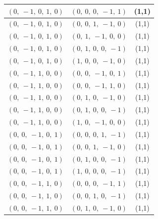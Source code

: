 \documentclass[11pt]{article}
\theoremstyle{definition}
\begin{document}
\begin{longtable}{|l|l|c|}
    \hline
    $\left( 0, \  -1, \  0, \  1, \  0\right)$ & $\left( 0, \  0, \  0, \  -1, \  1\right)$ & (1,1) \\
    \hline
    $\left( 0, \  -1, \  0, \  1, \  0\right)$ & $\left( 0, \  0, \  1, \  -1, \  0\right)$ & (1,1) \\
    \hline
    $\left( 0, \  -1, \  0, \  1, \  0\right)$ & $\left( 0, \  1, \  -1, \  0, \  0\right)$ & (1,1) \\
    \hline
    $\left( 0, \  -1, \  0, \  1, \  0\right)$ & $\left( 0, \  1, \  0, \  0, \  -1\right)$ & (1,1) \\
    \hline
    $\left( 0, \  -1, \  0, \  1, \  0\right)$ & $\left( 1, \  0, \  0, \  -1, \  0\right)$ & (1,1) \\
    \hline
    $\left( 0, \  -1, \  1, \  0, \  0\right)$ & $\left( 0, \  0, \  -1, \  0, \  1\right)$ & (1,1) \\
    \hline
    $\left( 0, \  -1, \  1, \  0, \  0\right)$ & $\left( 0, \  0, \  -1, \  1, \  0\right)$ & (1,1) \\
    \hline
    $\left( 0, \  -1, \  1, \  0, \  0\right)$ & $\left( 0, \  1, \  0, \  -1, \  0\right)$ & (1,1) \\
    \hline
    $\left( 0, \  -1, \  1, \  0, \  0\right)$ & $\left( 0, \  1, \  0, \  0, \  -1\right)$ & (1,1) \\
    \hline
    $\left( 0, \  -1, \  1, \  0, \  0\right)$ & $\left( 1, \  0, \  -1, \  0, \  0\right)$ & (1,1) \\
    \hline
    $\left( 0, \  0, \  -1, \  0, \  1\right)$ & $\left( 0, \  0, \  0, \  1, \  -1\right)$ & (1,1) \\
    \hline
    $\left( 0, \  0, \  -1, \  0, \  1\right)$ & $\left( 0, \  0, \  1, \  -1, \  0\right)$ & (1,1) \\
    \hline
    $\left( 0, \  0, \  -1, \  0, \  1\right)$ & $\left( 0, \  1, \  0, \  0, \  -1\right)$ & (1,1) \\
    \hline
    $\left( 0, \  0, \  -1, \  0, \  1\right)$ & $\left( 1, \  0, \  0, \  0, \  -1\right)$ & (1,1) \\
    \hline
    $\left( 0, \  0, \  -1, \  1, \  0\right)$ & $\left( 0, \  0, \  0, \  -1, \  1\right)$ & (1,1) \\
    \hline
    $\left( 0, \  0, \  -1, \  1, \  0\right)$ & $\left( 0, \  0, \  1, \  0, \  -1\right)$ & (1,1) \\
    \hline
    $\left( 0, \  0, \  -1, \  1, \  0\right)$ & $\left( 0, \  1, \  0, \  -1, \  0\right)$ & (1,1) \\

\end{longtable}
\end{document}
